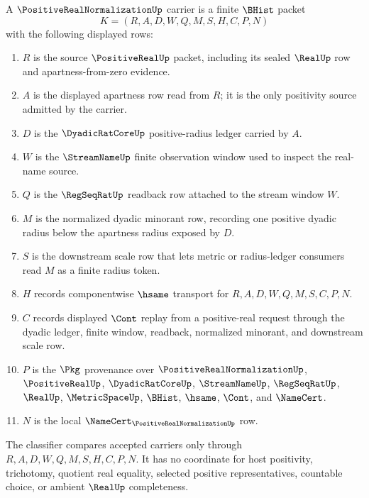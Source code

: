\begin{definition}
\label{def:positive-real-normalization-carrier}
A $\PositiveRealNormalizationUp$ carrier is a finite $\BHist$ packet
$$
K=(R,A,D,W,Q,M,S,H,C,P,N)
$$
with the following displayed rows:
\begin{enumerate}
\item $R$ is the source $\PositiveRealUp$ packet, including its sealed $\RealUp$ row and apartness-from-zero evidence.
\item $A$ is the displayed apartness row read from $R$; it is the only positivity source admitted by the carrier.
\item $D$ is the $\DyadicRatCoreUp$ positive-radius ledger carried by $A$.
\item $W$ is the $\StreamNameUp$ finite observation window used to inspect the real-name source.
\item $Q$ is the $\RegSeqRatUp$ readback row attached to the stream window $W$.
\item $M$ is the normalized dyadic minorant row, recording one positive dyadic radius below the apartness radius exposed by $D$.
\item $S$ is the downstream scale row that lets metric or radius-ledger consumers read $M$ as a finite radius token.
\item $H$ records componentwise $\hsame$ transport for $R,A,D,W,Q,M,S,C,P,N$.
\item $C$ records displayed $\Cont$ replay from a positive-real request through the dyadic ledger, finite window, readback, normalized minorant, and downstream scale row.
\item $P$ is the $\Pkg$ provenance over $\PositiveRealNormalizationUp$, $\PositiveRealUp$, $\DyadicRatCoreUp$, $\StreamNameUp$, $\RegSeqRatUp$, $\RealUp$, $\MetricSpaceUp$, $\BHist$, $\hsame$, $\Cont$, and $\NameCert$.
\item $N$ is the local $\NameCert_{\PositiveRealNormalizationUp}$ row.
\end{enumerate}
The classifier compares accepted carriers only through $R,A,D,W,Q,M,S,H,C,P,N$. It has no coordinate for host positivity, trichotomy, quotient real equality, selected positive representatives, countable choice, or ambient $\RealUp$ completeness.
\end{definition}

